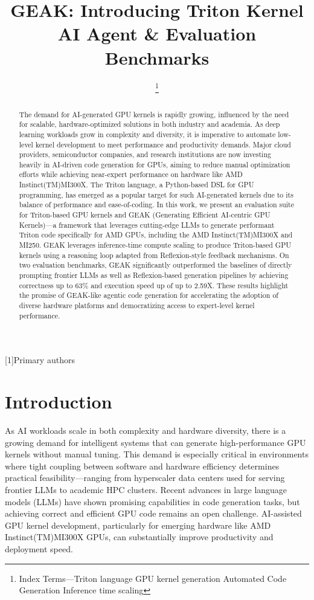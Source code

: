 \documentclass[conference]{IEEEtran}
\title{GEAK: Introducing Triton Kernel AI Agent \& Evaluation Benchmarks}
\author{\IEEEauthorblockN{\parbox[t]{\textwidth}{Jianghui Wang, Vinay Joshi, Saptarshi Majumder, Xu Chao, Bin Ding, Ziqiong Liu, Pratik Prabhanjan Brahma, Dong Li, Zicheng Liu, and Emad Barsoum}}
\IEEEauthorblockA{Advanced Micro Devices, Inc. (AMD)}
\thanks{Index Terms---Triton language GPU kernel generation Automated Code Generation Inference time scaling}
}
\providecommand{\texttrademark}{(TM)}
\begin{document}
\maketitle

\begin{abstract}
The demand for AI-generated GPU kernels is rapidly growing, influenced by the need for scalable, hardware-optimized solutions in both industry and academia. As deep learning workloads grow in complexity and diversity, it is imperative to automate low-level kernel development to meet performance and productivity demands. Major cloud providers, semiconductor companies, and research institutions are now investing heavily in AI-driven code generation for GPUs, aiming to reduce manual optimization efforts while achieving near-expert performance on hardware like AMD Instinct\texttrademark MI300X. The Triton language, a Python-based DSL for GPU programming, has emerged as a popular target for such AI-generated kernels due to its balance of performance and ease-of-coding. In this work, we present an evaluation suite for Triton-based GPU kernels and GEAK (Generating Efficient AI-centric GPU Kernels)---a framework that leverages cutting-edge LLMs to generate performant Triton code specifically for AMD GPUs, including the AMD Instinct\texttrademark MI300X and MI250. GEAK leverages inference-time compute scaling to produce Triton-based GPU kernels using a reasoning loop adapted from Reflexion-style feedback mechanisms. On two evaluation benchmarks, GEAK significantly outperformed the baselines of directly prompting frontier LLMs as well as Reflexion-based generation pipelines by achieving correctness up to $63$\% and execution speed up of up to 2.59X. These results highlight the promise of GEAK-like agentic code generation for accelerating the adoption of diverse hardware platforms and democratizing access to expert-level kernel performance.
\end{abstract}


[1]Primary authors
\section{Introduction}
As AI workloads scale in both complexity and hardware diversity, there is a growing demand for intelligent systems that can generate high-performance GPU kernels without manual tuning. This demand is especially critical in environments where tight coupling between software and hardware efficiency determines practical feasibility---ranging from hyperscaler data centers used for serving frontier LLMs to academic HPC clusters. Recent advances in large language models (LLMs) have shown promising capabilities in code generation tasks, but achieving correct and efficient GPU code remains an open challenge. AI-assisted GPU kernel development, particularly for emerging hardware like AMD Instinct\texttrademark MI300X GPUs, can substantially improve productivity and deployment speed.
\end{document}
